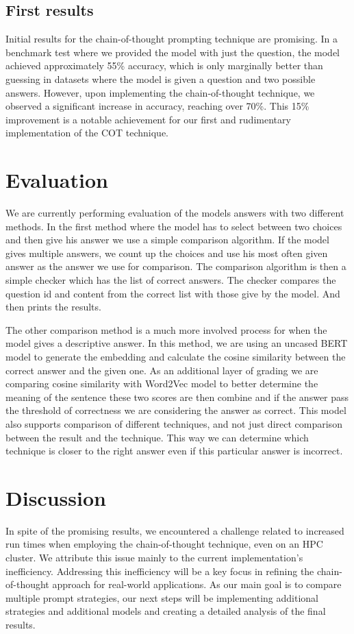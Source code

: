 \documentclass[fleqn,moreauthors,10pt]{ds_report}
\begin{document}
\subsection{First results}
Initial results for the chain-of-thought prompting technique are promising. In a benchmark test where we provided the model with just the question, the model achieved approximately 55\% accuracy, which is only marginally better than guessing in datasets where the model is given a question and two possible answers. However, upon implementing the chain-of-thought technique, we observed a significant increase in accuracy, reaching over 70\%. This 15\% improvement is a notable achievement for our first and rudimentary implementation of the COT technique.


\section*{Evaluation}
We are currently performing evaluation of the models answers with two different methods. In the first method where the model has to select between two choices and then give his answer we use a simple comparison algorithm. If the model gives multiple answers, we count up the choices and use his most often given answer as the answer we use for comparison. The comparison algorithm is then a simple checker which has the list of correct answers. The checker compares the question id and content from the correct list with those give by the model. And then prints the results.

The other comparison method is a much more involved process for when the model gives a descriptive answer. In this method, we are using an uncased BERT model to generate the embedding and calculate the cosine similarity between the correct answer and the given one. As an additional layer of grading we are comparing cosine similarity with Word2Vec model to better determine the meaning of the sentence these two scores are then combine and if the answer pass the threshold of correctness we are considering the answer as correct. This model also supports comparison of different techniques, and not just direct comparison between the result and the technique. This way we can determine which technique is closer to the right answer even if this particular answer is incorrect.

\section{Discussion}
In spite of the promising results, we encountered a challenge related to increased run times when employing the chain-of-thought technique, even on an HPC cluster. We attribute this issue mainly to the current implementation's inefficiency. Addressing this inefficiency will be a key focus in refining the chain-of-thought approach for real-world applications.
As our main goal is to compare multiple prompt strategies, our next steps will be implementing additional strategies and additional models and creating a detailed analysis of the final results.

 


\end{document}
